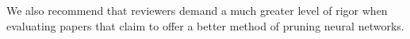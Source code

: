 We also recommend that reviewers demand a much greater level of rigor when evaluating papers that claim to offer a better method of pruning neural networks.


\usepackage{bbm}  %

\usepackage{amsmath}          %
\usepackage{amssymb} 			    %
\usepackage{textcomp}

\usepackage{url}              %

\usepackage{array}            %
\usepackage{tabularx}         %
\usepackage{colortbl}

\usepackage{mathtools}          %
\DeclarePairedDelimiter\Floor\lfloor\rfloor
\DeclarePairedDelimiter\Ceil\lceil\rceil

\DeclareMathOperator*{\argmin}{argmin} %
\DeclareMathOperator*{\argmax}{argmax} %

\usepackage{pbox}   %

\usepackage{setspace}







